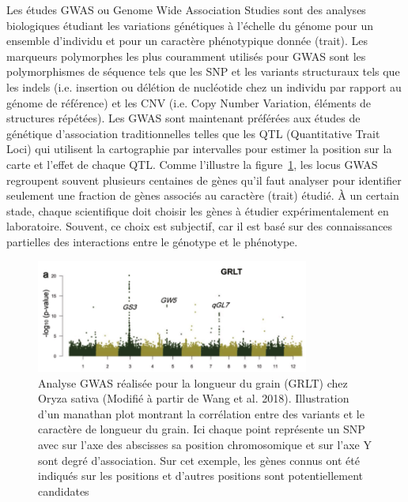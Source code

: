 Les études GWAS ou Genome Wide Association Studies sont des analyses biologiques étudiant les variations génétiques à l'échelle du génome pour un ensemble d'individu et pour un caractère phénotypique donnée (trait). Les marqueurs polymorphes les plus couramment utilisés pour GWAS sont les polymorphismes de séquence tels que les SNP et les variants structuraux tels que les indels (i.e. insertion ou délétion de nucléotide chez un individu par rapport au génome de référence) et les CNV (i.e. Copy Number Variation, éléments de structures répétées). Les GWAS sont maintenant préférées aux études de génétique d'association traditionnelles telles que les QTL (Quantitative Trait Loci) qui utilisent la cartographie par intervalles pour estimer la position sur la carte et l'effet de chaque QTL. Comme l'illustre la figure~\ref{fig:plot}, les locus GWAS regroupent souvent plusieurs centaines de gènes qu'il faut analyser pour identifier seulement une fraction de gènes associés au caractère (trait) étudié.  À un certain stade, chaque scientifique doit choisir les gènes à étudier expérimentalement en laboratoire. Souvent, ce choix est subjectif, car il est basé sur des connaissances partielles des interactions entre le génotype et le phénotype.


\begin{figure}[!ht]
    \centering
    \includegraphics[width=0.8\textwidth]{hdr_manuscript/Figures/Manathan_Plot_rice.png}
    \caption{Analyse GWAS réalisée pour la longueur du grain (GRLT) chez Oryza sativa (Modifié à partir de Wang et al. 2018). Illustration d'un manathan plot montrant la corrélation entre des variants et le caractère de longueur du grain. Ici chaque point représente un SNP avec sur l'axe des abscisses sa position chromosomique et sur l'axe Y sont degré d'association. Sur cet exemple, les gènes connus ont été indiqués sur les positions et d'autres positions sont potentiellement candidates }
    \label{fig:plot}
\end{figure}

